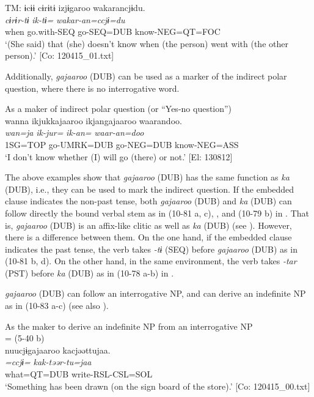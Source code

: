   \ex  TM:
      \glll    ɨcɨɨ  cɨrɨtɨ  izjɨgaroo  wakarancjɨdu.\\
      \textit{}  \textit{cɨrɨr-tɨ}  \textit{ik-tɨ=}  \textit{wakar-an=ccjɨ=du}\\
      when  go.with-SEQ  go-SEQ=DUB  know-NEG=QT=FOC\\
      \glt       ‘(She said) that (she) doesn’t know when (the person) went with (the other person).’ [Co: 120415\_01.txt]
    \z
\z

Additionally, \textit{gajaaroo} (DUB) can be used as a marker of the indirect polar question, where there is no interrogative word.

\ea\label{ex:10.82}   As a maker of indirect polar question (or “Yes-no question”)\\
      \glll    wanna  ikjukkajaaroo  ikjangajaaroo  waarandoo.\\
    \textit{wan=ja}  \textit{ik-jur=}  \textit{ik-an=}  \textit{waar-an=doo}\\
    1SG=TOP  go-UMRK=DUB  go-NEG=DUB  know-NEG=ASS\\
    \glt     ‘I don’t know whether (I) will go (there) or not.’ [El: 130812]
\z

The above examples show that \textit{gajaaroo} (DUB) has the same function as \textit{ka} (DUB), i.e., they can be used to mark the indirect question. If the embedded clause indicates the non-past tense, both \textit{gajaaroo} (DUB) and \textit{ka} (DUB) can follow directly the bound verbal stem as in (10-81 a, c), , and (10-79 b) in . That is, \textit{gajaaroo} (DUB) is an affix-like clitic as well as \textit{ka} (DUB) (see ). However, there is a difference between them. On the one hand, if the embedded clause indicates the past tense, the verb takes \textit{{}-tɨ} (SEQ) before \textit{gajaaroo} (DUB) as in (10-81 b, d). On the other hand, in the same environment, the verb takes \textit{{}-tar} (PST) before \textit{ka} (DUB) as in (10-78 a-b) in .

  \textit{gajaaroo} (DUB) can follow an interrogative NP, and can derive an indefinite NP as in (10-83 a-c) (see also ).

\ea\label{ex:10.83}   As the maker to derive an indefinite NP from an interrogative NP\\
  \ea{} = (5-40 b)\\
      \glll    nuucjɨgajaaroo  kacjəəttujaa.\\
      \textit{=ccjɨ=}  \textit{kak-təər-tu=jaa}\\
      what=QT=DUB  write-RSL-CSL=SOL\\
      \glt       ‘Something has been drawn (on the sign board of the store).’ [Co: 120415\_00.txt]

